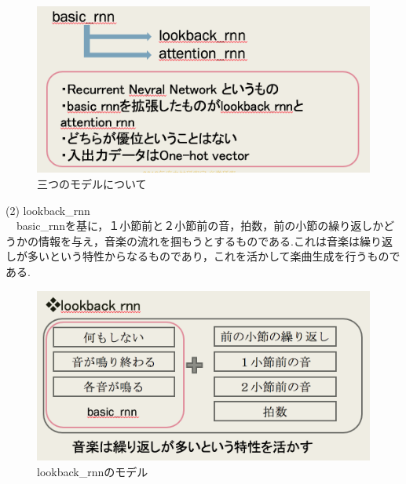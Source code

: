 \begin{figure}[!ht]
    \begin{screen}
    \begin{center}
        \includegraphics[scale=0.8,clip]{./img/basic1.png}
        \caption{三つのモデルについて}
        \label{fig:Melody_RNNについて}
    \end{center}
    \end{screen}
\end{figure}
\newpage
(2) lookback\_rnn\\
　basic\_rnnを基に，１小節前と２小節前の音，拍数，前の小節の繰り返しかどうかの情報を与え，音楽の流れを掴もうとするものである.これは音楽は繰り返しが多いという特性からなるものであり，これを活かして楽曲生成を行うものである.
\begin{figure}[!ht]
    \begin{screen}
    \begin{center}
        \includegraphics[scale=0.8,clip]{./img/lookback1.png}
        \caption{lookback\_rnnのモデル}
        \label{fig:lookback_rnnのモデル}
    \end{center}
    \end{screen}
\end{figure}\\
